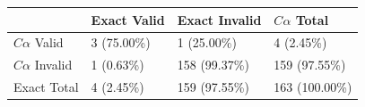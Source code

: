 \begin{tabular}{llll}
\toprule
 & Exact Valid & Exact Invalid & $C\alpha$ Total \\
\midrule
$C\alpha$ Valid & 3 (75.00\%) & 1 (25.00\%) & 4 (2.45\%) \\
$C\alpha$ Invalid & 1 (0.63\%) & 158 (99.37\%) & 159 (97.55\%) \\
Exact Total & 4 (2.45\%) & 159 (97.55\%) & 163 (100.00\%) \\
\bottomrule
\end{tabular}
